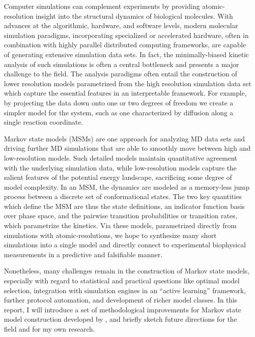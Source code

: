 \documentclass[twocolumn,floatfix,nofootinbib,aps]{revtex4-1}
\begin{document}
Computer simulations can complement experiments by providing atomic-resolution insight into the structural dynamics of biological molecules. With advances at the algorithmic, hardware, and software levels, modern molecular simulation paradigms, incorporating specialized or accelerated hardware, often in combination with highly parallel distributed computing frameworks, are capable of generating extensive simulation data sets\cite{Eastman2013OpenMM, Shirts2000Screen, Shaw2009Millisecond, Hess2008PLINCS}. In fact, the minimally-biased kinetic analysis of such simulations is often a central bottleneck and presents a major challenge to the field. The analysis paradigms often entail the construction of lower resolution models parametrized from the high resolution simulation data set which capture the essential features in an interpretable framework\cite{Freddolino2010Challenges, Lane2013Milliseconds}. For example, by projecting the data down onto one or two degrees of freedom we create a simpler model for the system, such as one characterized by diffusion along a single reaction coordinate\cite{Best2010Coordinate}.

Markov state models (MSMs) are one approach for analyzing MD data sets and driving further MD simulations that are able to smoothly move between high and low-resolution models\cite{Pande2010Everything, Beauchamp2012Simple, Prinz2011Markov, Bowman2013Quantitative}. Such detailed models maintain quantitative agreement with the underlying simulation data, while low-resolution models capture the salient features of the potential energy landscape, sacrificing some degree of model complexity. In an MSM, the dynamics are modeled as a memory-less jump process between a discrete set of conformational states. The two key quantities which define the MSM are thus the state definitions, an indicator function basis over phase space, and the pairwise transition probabilities or transition rates, which parametrize the kinetics. Via these models, parametrized directly from simulations with atomic-resolutions, we hope to synthesize many short simulations into a single model and directly connect to experimental biophysical measurements in a predictive and falsifiable manner.

Nonetheless, many challenges remain in the construction of Markov state models, especially with regard to statistical and practical questions like optimal model selection, integration with simulation engines in an ``active learning'' framework, further protocol automation, and development of richer model classes. In this report, I will introduce a set of methodological improvements for Markov state model construction developed by \textcite{McGibbon2013Learning}, and briefly sketch future directions for the field and for my own research. 
\end{document}
